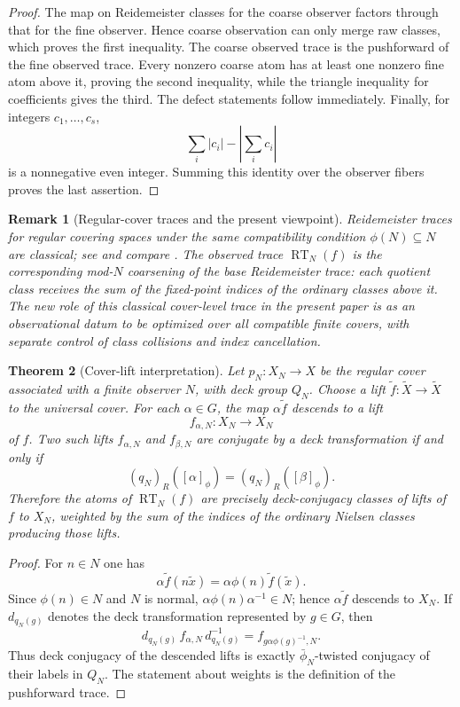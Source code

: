 \documentclass[11pt]{article}
\newtheorem{theorem}{Theorem}[section]
\newtheorem{remark}[theorem]{Remark}
\newcommand{\RT}{\operatorname{RT}}
\begin{document}
\begin{proof}
The map on Reidemeister classes for the coarse observer factors through that
for the fine observer.  Hence coarse observation can only merge raw classes,
which proves the first inequality.  The coarse observed trace is the
pushforward of the fine observed trace.  Every nonzero coarse atom has at
least one nonzero fine atom above it, proving the second inequality, while
the triangle inequality for coefficients gives the third.  The defect
statements follow immediately.  Finally, for integers $c_1,\dots,c_s$,
\[
  \sum_i|c_i|-\left|\sum_i c_i\right|
\]
is a nonnegative even integer.  Summing this identity over the observer
fibers proves the last assertion.
\end{proof}

\begin{remark}[Regular-cover traces and the present viewpoint]
Reidemeister traces for regular covering spaces under the same compatibility
condition $\phi(N)\subseteq N$ are classical; see
\cite[Section~6.7]{Ponto} and compare \cite[Section~5]{Staecker}.  The
observed trace $\RT_N(f)$ is the corresponding mod-$N$ coarsening of the
base Reidemeister trace: each quotient class receives the sum of the
fixed-point indices of the ordinary classes above it.  The new role of this
classical cover-level trace in the present paper is as an observational datum
to be optimized over all compatible finite covers, with separate control of
class collisions and index cancellation.
\end{remark}

\begin{theorem}[Cover-lift interpretation]
\label{thm:coverlift}
Let $p_N\colon X_N\to X$ be the regular cover associated with a finite
observer $N$, with deck group $Q_N$.  Choose a lift
$\widetilde f\colon\widetilde X\to\widetilde X$ to the universal cover.  For
each $\alpha\in G$, the map $\alpha\widetilde f$ descends to a lift
\[
  f_{\alpha,N}\colon X_N\to X_N
\]
of $f$.  Two such lifts $f_{\alpha,N}$ and $f_{\beta,N}$ are conjugate by a
deck transformation if and only if
\[
  (q_N)_R([\alpha]_\phi)=(q_N)_R([\beta]_\phi).
\]
Therefore the atoms of $\RT_N(f)$ are precisely deck-conjugacy classes of
lifts of $f$ to $X_N$, weighted by the sum of the indices of the ordinary
Nielsen classes producing those lifts.
\end{theorem}

\begin{proof}
For $n\in N$ one has
\[
  \alpha\widetilde f(n\widetilde x)
  =\alpha\phi(n)\widetilde f(\widetilde x).
\]
Since $\phi(n)\in N$ and $N$ is normal,
$\alpha\phi(n)\alpha^{-1}\in N$; hence $\alpha\widetilde f$ descends to
$X_N$.  If $d_{q_N(g)}$ denotes the deck transformation represented by
$g\in G$, then
\[
  d_{q_N(g)}\,f_{\alpha,N}\,d_{q_N(g)}^{-1}
  =f_{g\alpha\phi(g)^{-1},N}.
\]
Thus deck conjugacy of the descended lifts is exactly
$\bar\phi_N$-twisted conjugacy of their labels in $Q_N$.  The statement about
weights is the definition of the pushforward trace.
\end{proof}
\end{document}
